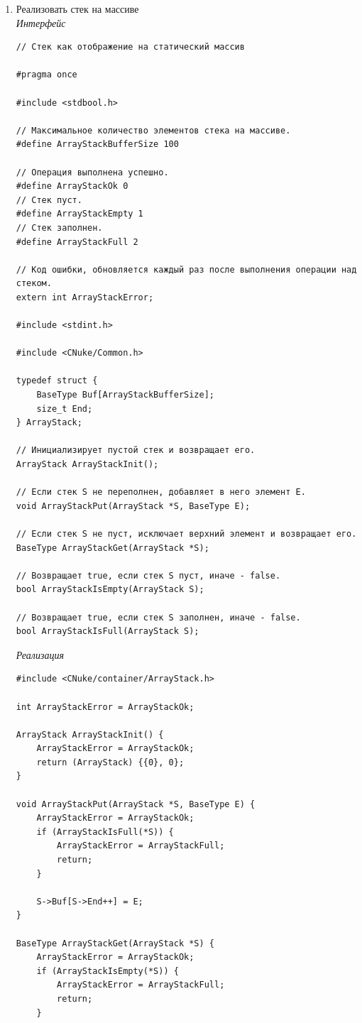 \documentclass[a4paper,14pt]{extarticle}
\begin{document}
\begin{enumerate}
	\item Реализовать стек на массиве\\
	\textit{Интерфейс}
    \begin{verbatim}
// Стек как отображение на статический массив

#pragma once

#include <stdbool.h>

// Максимальное количество элементов стека на массиве.
#define ArrayStackBufferSize 100

// Операция выполнена успешно.
#define ArrayStackOk 0
// Стек пуст.
#define ArrayStackEmpty 1
// Стек заполнен.
#define ArrayStackFull 2

// Код ошибки, обновляется каждый раз после выполнения операции над стеком.
extern int ArrayStackError;

#include <stdint.h>

#include <CNuke/Common.h>

typedef struct {
    BaseType Buf[ArrayStackBufferSize];
    size_t End;
} ArrayStack;

// Инициализирует пустой стек и возвращает его.
ArrayStack ArrayStackInit();

// Если стек S не переполнен, добавляет в него элемент E.
void ArrayStackPut(ArrayStack *S, BaseType E);

// Если стек S не пуст, исключает верхний элемент и возвращает его.
BaseType ArrayStackGet(ArrayStack *S);

// Возвращает true, если стек S пуст, иначе - false.
bool ArrayStackIsEmpty(ArrayStack S);

// Возвращает true, если стек S заполнен, иначе - false.
bool ArrayStackIsFull(ArrayStack S);
    \end{verbatim}
    \textit{Реализация}
\begin{verbatim}
#include <CNuke/container/ArrayStack.h>

int ArrayStackError = ArrayStackOk;

ArrayStack ArrayStackInit() {
    ArrayStackError = ArrayStackOk;
    return (ArrayStack) {{0}, 0};
}

void ArrayStackPut(ArrayStack *S, BaseType E) {
    ArrayStackError = ArrayStackOk;
    if (ArrayStackIsFull(*S)) {
        ArrayStackError = ArrayStackFull;
        return;
    }

    S->Buf[S->End++] = E;
}

BaseType ArrayStackGet(ArrayStack *S) {
    ArrayStackError = ArrayStackOk;
    if (ArrayStackIsEmpty(*S)) {
        ArrayStackError = ArrayStackFull;
        return;
    }


\end{verbatim}
\end{enumerate}
\end{document}
